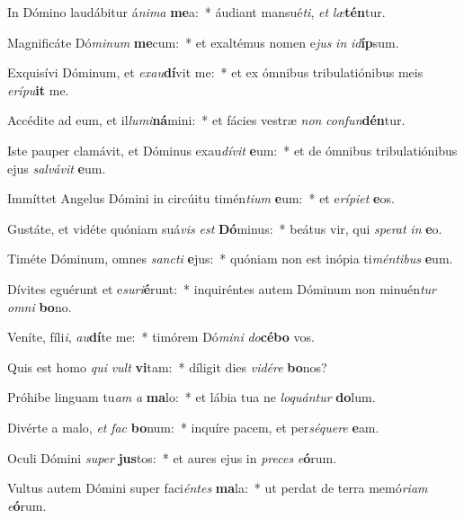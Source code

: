 \item In Dómino laudábitur á\textit{ni}\textit{ma} \textbf{me}a:~* áudiant mansué\textit{ti}, \textit{et} \textit{læ}\textbf{tén}tur.
\item Magnificáte Dó\textit{mi}\textit{num} \textbf{me}cum:~* et exaltémus nomen e\textit{jus} \textit{in} \textit{id}\textbf{íp}sum.
\item Exquisívi Dóminum, et \textit{ex}\textit{au}\textbf{dí}vit me:~* et ex ómnibus tribulatiónibus meis \textit{e}\textit{rí}\textit{pu}\textbf{it} me.
\item Accédite ad eum, et il\textit{lu}\textit{mi}\textbf{ná}mini:~* et fácies vestræ \textit{non} \textit{con}\textit{fun}\textbf{dén}tur.
\item Iste pauper clamávit, et Dóminus exau\textit{dí}\textit{vit} \textbf{e}um:~* et de ómnibus tribulatiónibus ejus \textit{sal}\textit{vá}\textit{vit} \textbf{e}um.
\item Immíttet Angelus Dómini in circúitu timén\textit{ti}\textit{um} \textbf{e}um:~* et e\textit{rí}\textit{pi}\textit{et} \textbf{e}os.
\item Gustáte, et vidéte quóniam suá\textit{vis} \textit{est} \textbf{Dó}minus:~* beátus vir, qui \textit{spe}\textit{rat} \textit{in} \textbf{e}o.
\item Timéte Dóminum, omnes \textit{sanc}\textit{ti} \textbf{e}jus:~* quóniam non est inópia ti\textit{mén}\textit{ti}\textit{bus} \textbf{e}um.
\item Dívites eguérunt et e\textit{su}\textit{ri}\textbf{é}runt:~* inquiréntes autem Dóminum non minuén\textit{tur} \textit{om}\textit{ni} \textbf{bo}no.
\item Veníte, fíli\textit{i}, \textit{au}\textbf{dí}te me:~* timórem Dó\textit{mi}\textit{ni} \textit{do}\textbf{cé}\textbf{bo} vos.
\item Quis est homo \textit{qui} \textit{vult} \textbf{vi}tam:~* díligit dies \textit{vi}\textit{dé}\textit{re} \textbf{bo}nos?
\item Próhibe linguam tu\textit{am} \textit{a} \textbf{ma}lo:~* et lábia tua ne \textit{lo}\textit{quán}\textit{tur} \textbf{do}lum.
\item Divérte a malo, \textit{et} \textit{fac} \textbf{bo}num:~* inquíre pacem, et per\textit{sé}\textit{que}\textit{re} \textbf{e}am.
\item Oculi Dómini \textit{su}\textit{per} \textbf{jus}tos:~* et aures ejus in \textit{pre}\textit{ces} \textit{e}\textbf{ó}rum.
\item Vultus autem Dómini super faci\textit{én}\textit{tes} \textbf{ma}la:~* ut perdat de terra memó\textit{ri}\textit{am} \textit{e}\textbf{ó}rum.
